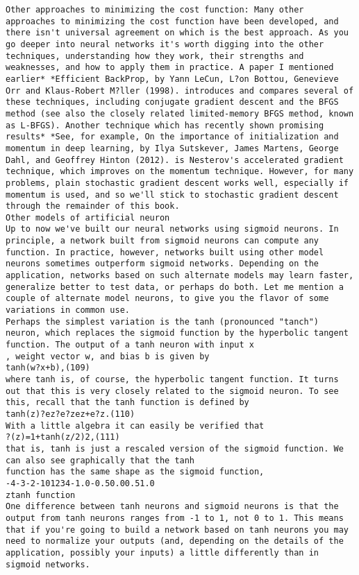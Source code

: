 \begin{lstlisting}
Other approaches to minimizing the cost function: Many other approaches to minimizing the cost function have been developed, and there isn't universal agreement on which is the best approach. As you go deeper into neural networks it's worth digging into the other techniques, understanding how they work, their strengths and weaknesses, and how to apply them in practice. A paper I mentioned earlier* *Efficient BackProp, by Yann LeCun, L?on Bottou, Genevieve Orr and Klaus-Robert M?ller (1998). introduces and compares several of these techniques, including conjugate gradient descent and the BFGS method (see also the closely related limited-memory BFGS method, known as L-BFGS). Another technique which has recently shown promising results* *See, for example, On the importance of initialization and momentum in deep learning, by Ilya Sutskever, James Martens, George Dahl, and Geoffrey Hinton (2012). is Nesterov's accelerated gradient technique, which improves on the momentum technique. However, for many problems, plain stochastic gradient descent works well, especially if momentum is used, and so we'll stick to stochastic gradient descent through the remainder of this book.
Other models of artificial neuron
Up to now we've built our neural networks using sigmoid neurons. In principle, a network built from sigmoid neurons can compute any function. In practice, however, networks built using other model neurons sometimes outperform sigmoid networks. Depending on the application, networks based on such alternate models may learn faster, generalize better to test data, or perhaps do both. Let me mention a couple of alternate model neurons, to give you the flavor of some variations in common use.
Perhaps the simplest variation is the tanh (pronounced "tanch") neuron, which replaces the sigmoid function by the hyperbolic tangent function. The output of a tanh neuron with input x
, weight vector w, and bias b is given by 
tanh(w?x+b),(109)
where tanh is, of course, the hyperbolic tangent function. It turns out that this is very closely related to the sigmoid neuron. To see this, recall that the tanh function is defined by 
tanh(z)?ez?e?zez+e?z.(110)
With a little algebra it can easily be verified that 
?(z)=1+tanh(z/2)2,(111)
that is, tanh is just a rescaled version of the sigmoid function. We can also see graphically that the tanh
function has the same shape as the sigmoid function,
-4-3-2-101234-1.0-0.50.00.51.0
ztanh function
One difference between tanh neurons and sigmoid neurons is that the output from tanh neurons ranges from -1 to 1, not 0 to 1. This means that if you're going to build a network based on tanh neurons you may need to normalize your outputs (and, depending on the details of the application, possibly your inputs) a little differently than in sigmoid networks.

\end{lstlisting}
